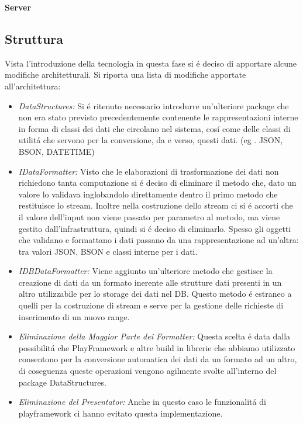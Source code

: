 \begin{center}
  \textbf{Server}
\end{center}

\subsection{Struttura}

Vista l'introduzione della tecnologia in questa fase si \'e deciso di apportare alcune modifiche architetturali. Si riporta una lista di modifiche apportate all'architettura:

\begin{itemize}
  \item \textit{DataStructures:} Si \'e ritenuto necessario introdurre un'ulteriore package che non era stato previsto precedentemente contenente le rappresentazioni interne in forma di classi dei dati che circolano nel sistema, cos\'i come delle classi di utilit\'a che servono per la conversione, da e verso, questi dati. (eg . JSON, BSON, DATETIME)
  \item \textit{IDataFormatter:} Visto che le elaborazioni di trasformazione dei dati non richiedono tanta computazione si \'e deciso di eliminare il metodo che, dato un valore lo validava inglobandolo direttamente dentro il primo metodo che restituisce lo stream. Inoltre nella costruzione dello stream ci si \'e accorti che il valore dell'input non viene passato per parametro al metodo, ma viene gestito dall'infrastruttura, quindi si \'e deciso di eliminarlo. Spesso gli oggetti che validano e formattano i dati passano da una rappresentazione ad un'altra: tra valori JSON, BSON e classi interne per i dati.
  \item \textit{IDBDataFormatter:} Viene aggiunto un'ulteriore metodo che gestisce la creazione di dati da un formato inerente alle strutture dati presenti in un altro utilizzabile per lo storage dei dati nel DB. Questo metodo \'e estraneo a quelli per la costruzione di stream e serve per la gestione delle richieste di inserimento di un nuovo range.
  \item \textit{Eliminazione della Maggior Parte dei Formatter:} Questa scelta \'e data dalla possibilit\'a che PlayFramework e altre build in librerie che abbiamo utilizzato consentono per la conversione automatica dei dati da un formato ad un altro, di coseguenza queste operazioni vengono agilmente svolte all'interno del package DataStructures.
  \item \textit{Eliminazione del Presentator:} Anche in questo caso le funzionalit\'a di playframework ci hanno evitato questa implementazione.

\end{itemize}
